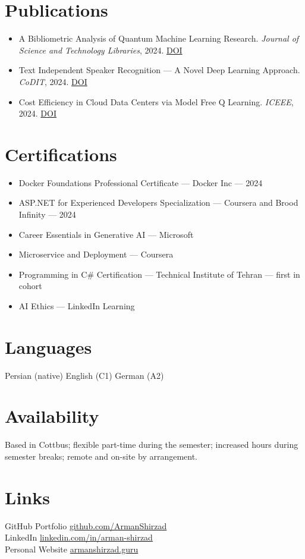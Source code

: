 \documentclass[10pt]{article}
\begin{document}
\section*{Publications}
\begin{itemize}
  \item A Bibliometric Analysis of Quantum Machine Learning Research. \emph{Journal of Science and Technology Libraries}, 2024. \href{https://doi.org/10.1080/0194262X.2023.2292049}{DOI}
  \item Text Independent Speaker Recognition — A Novel Deep Learning Approach. \emph{CoDIT}, 2024. \href{https://doi.org/10.1109/CoDIT62066.2024.10708578}{DOI}
  \item Cost Efficiency in Cloud Data Centers via Model Free Q Learning. \emph{ICEEE}, 2024. \href{https://doi.org/10.1007/978-981-97-9112-5_27}{DOI}
\end{itemize}

\section*{Certifications}
\begin{itemize}
  \item Docker Foundations Professional Certificate — Docker Inc — 2024
  \item ASP.NET for Experienced Developers Specialization — Coursera and Brood Infinity — 2024
  \item Career Essentials in Generative AI — Microsoft
  \item Microservice and Deployment — Coursera
  \item Programming in C\# Certification — Technical Institute of Tehran — first in cohort
  \item AI Ethics — LinkedIn Learning
\end{itemize}

\section*{Languages}
Persian (native) \quad English (C1) \quad German (A2)

\section*{Availability}
Based in Cottbus; flexible part-time during the semester; increased hours during semester breaks; remote and on-site by arrangement.

\section*{Links}
GitHub Portfolio  \href{https://github.com/ArmanShirzad}{github.com/ArmanShirzad}\\
LinkedIn  \href{https://linkedin.com/in/arman-shirzad}{linkedin.com/in/arman-shirzad}\\
Personal Website  \href{https://armanshirzad.guru}{armanshirzad.guru}
\end{document}
